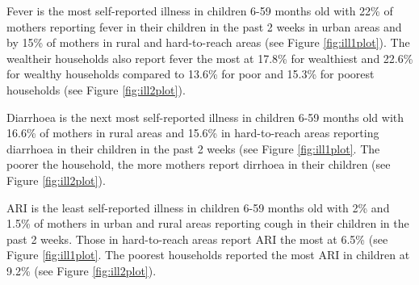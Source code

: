 \documentclass[12pt,a4paper]{article}
\begin{document}
Fever is the most self-reported illness in children 6-59 months old with 22\% of mothers reporting fever in their children in the past 2 weeks in urban areas and by 15\% of mothers in rural and hard-to-reach areas (see Figure \ref{fig:ill1plot}). The wealtheir households also report fever the most at 17.8\% for wealthiest and 22.6\% for wealthy households compared to 13.6\% for poor and 15.3\% for poorest households (see Figure \ref{fig:ill2plot}).

Diarrhoea is the next most self-reported illness in children 6-59 months old with 16.6\% of mothers in rural areas and 15.6\% in hard-to-reach areas reporting diarrhoea in their children in the past 2 weeks (see Figure \ref{fig:ill1plot}. The poorer the household, the more mothers report dirrhoea in their children (see Figure \ref{fig:ill2plot}).

ARI is the least self-reported illness in children 6-59 months old with 2\% and 1.5\% of mothers in urban and rural areas reporting cough in their children in the past 2 weeks. Those in hard-to-reach areas report ARI the most at 6.5\% (see Figure \ref{fig:ill1plot}. The poorest households reported the most ARI in children at 9.2\% (see Figure \ref{fig:ill2plot}).
\end{document}
